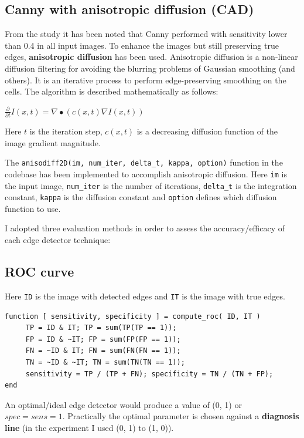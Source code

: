 \documentclass{article}
\begin{document}
	\subsection*{Canny with anisotropic diffusion (CAD)}	
	
	From the study it has been noted that Canny performed with sensitivity lower than
	0.4 in all input images. To enhance the images but still preserving true edges,
	\textbf{anisotropic diffusion} has been used.
	Anisotropic diffusion is a non-linear diffusion filtering for avoiding the
	blurring problems of Gaussian smoothing (and others). It is an iterative
	process to perform edge-preserving smoothing on the cells.
	The algorithm is described mathematically as follows:
	
	\begin{center}
	$\frac{\partial}{\partial t}I(x, t) = \nabla \bullet (c(x, t) \nabla I(x, t))$
	\end{center}		
	
	Here $t$ is the iteration step, $c(x, t)$ is a decreasing diffusion function
	of the image gradient magnitude.
	
	The \verb|anisodiff2D(im, num_iter, delta_t, kappa, option)| function in the codebase
	has been implemented to accomplish anisotropic diffusion. Here \verb|im| is the
	input image, \verb|num_iter| is the number of iterations, \verb|delta_t| is
	the integration constant, \verb|kappa| is the diffusion constant and
	\verb|option| defines which diffusion function to use.
	\newline
	
	I adopted three evaluation methods in order to assess the accuracy/efficacy of each edge
	detector technique:
	
	\subsection*{ROC curve}
	
	Here \verb|ID| is the image with detected edges and \verb|IT| is the image with
	true edges.	
	
\begin{verbatim}
function [ sensitivity, specificity ] = compute_roc( ID, IT )
     TP = ID & IT; TP = sum(TP(TP == 1));
     FP = ID & ~IT; FP = sum(FP(FP == 1));
     FN = ~ID & IT; FN = sum(FN(FN == 1));
     TN = ~ID & ~IT; TN = sum(TN(TN == 1));
     sensitivity = TP / (TP + FN); specificity = TN / (TN + FP);
end
\end{verbatim}

	An optimal/ideal edge detector would produce a value of (0, 1) or $spec = sens = 1$.
	Practically the optimal parameter is chosen against a \textbf{diagnosis line}
	(in the experiment I used (0, 1) to (1, 0)).
	
\end{document}
